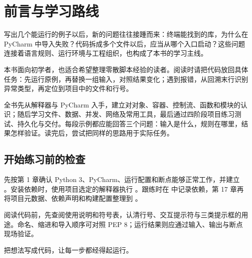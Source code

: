 \chapter{前言与学习路线}

写出几个能运行的例子以后，新的问题往往接踵而来：终端能找到的库，为什么在 PyCharm 中导入失败？代码拆成多个文件以后，应当从哪个入口启动？这些问题连接着语言规则、运行环境与工程组织，也构成了本书的学习主线。

本书面向初学者，也适合希望整理零散脚本经验的读者。阅读时请把代码放回具体任务：先运行原例，再替换一组输入，对照结果变化；遇到报错，从回溯末行识别异常类型，再定位到项目中的文件和行号。

全书先从解释器与 PyCharm 入手，建立对对象、容器、控制流、函数和模块的认识；随后学习文件、数据、并发、网络及常用工具，最后通过四阶段项目练习测试、持久化与交付。每段示例都应能回答三个问题：输入是什么，规则在哪里，结果怎样验证。读完后，尝试把同样的思路用于实际任务。

\section*{开始练习前的检查}

先按第 1 章确认 Python 3、PyCharm、运行配置和断点能够正常工作，并建立 。安装依赖时，使用项目选定的解释器执行 。跟练时在  中记录依赖，第 17 章再将项目元数据、依赖声明和构建配置整理到 。

阅读代码前，先查阅使用说明和符号表，认清行号、交互提示符与三类提示框的用途。命名、缩进和导入顺序可对照 PEP 8；运行结果则应通过输入、输出与断点现场验证。

\par\vspace{2.3em}
\begin{center}
  {\Large\sffamily\color{PyBlue}把想法写成代码，让每一步都经得起运行。}
\end{center}
